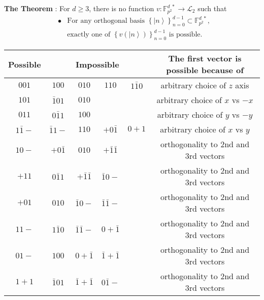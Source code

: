 \documentclass[english,12pt]{iopart}
\newcommand{\ffzd}[1]{{\mathbb{F}^{d\;*}_{#1}}}
\begin{document}
{\bf The Theorem \/}: For $d \ge 3$, there is
  no function $v:\ffzd{p^{2}}\rightarrow\mathscr{L}_{2}$ such that
\begin{eqnarray}
 & \bullet & \textrm{For any orthogonal basis }\left\{
  \left|n\right\rangle \right\}
  _{n=0}^{d-1}\subset\ffzd{p^{2}}\textrm{, }\nonumber \\ & &
  \textrm{exactly one of }\left\{ v\left(\left|n\right\rangle
  \right)\right\} _{n=0}^{d-1}
  \text{ is possible.}
  \label{enu:total-probability-DQT(I)-KS}
\end{eqnarray}

\begin{table*}
\begin{tabular}{|c|c|c|c|c|c|}
\hline Possible & \multicolumn{4}{c|}{Impossible} & The first vector
is possible because of\tabularnewline \hline $001$ & $100$ & $010$ &
$110$ & $1\bar{1}0$ & arbitrary choice of $z$ axis\tabularnewline
\hline $101$ & $\bar{1}01$ & $010$ & & & arbitrary choice of $x$ vs
$-x$\tabularnewline \hline $011$ & $0\bar{1}1$ & $100$ & & & arbitrary
choice of $y$ vs $-y$\tabularnewline \hline $1\bar{1}{-}$ &
$\bar{1}1{-}$ & $110$ & ${+}0\bar{1}$ & $0{+}1$ & arbitrary choice of
$x$ vs $y$\tabularnewline \hline $10{-}$ & ${+}0\bar{1}$ & $010$ &
${+}\bar{1}\bar{1}$ & & orthogonality to 2nd and 3rd
vectors\tabularnewline \hline ${+}11$ & $0\bar{1}1$ &
${+}\bar{1}\bar{1}$ & $\bar{1}0{-}$ & & orthogonality to 2nd and 3rd
vectors\tabularnewline \hline ${+}01$ & $010$ & $\bar{1}0{-}$ &
$\bar{1}\bar{1}{-}$ & & orthogonality to 2nd and 3rd
vectors\tabularnewline \hline $11{-}$ & $1\bar{1}0$ &
$\bar{1}\bar{1}{-}$ & $0{+}\bar{1}$ & & orthogonality to 2nd and 3rd
vectors\tabularnewline \hline $01{-}$ & $100$ & $0{+}\bar{1}$ &
$\bar{1}{+}\bar{1}$ & & orthogonality to 2nd and 3rd
vectors\tabularnewline \hline $1{+}1$ & $\bar{1}01$ &
$\bar{1}{+}\bar{1}$ & $0\bar{1}{-}$ & & orthogonality to 2nd and 3rd
vectors\tabularnewline \hline
\end{tabular}\protect\caption{\label{tab:proof-of-K-S}Proof of the Kochen-Specker theorem in DQT(I)(I)
in 3 dimensions.}
\end{table*}
\end{document}
